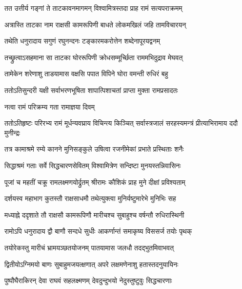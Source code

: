 \twolineshloka
{तत उत्तीर्य गङ्गां ते ताटकावनमागमन्}
{विश्वामित्रस्तदा प्राह रामं सत्यपराक्रमम्} %

\twolineshloka
{अत्रास्ति ताटका नाम राक्षसी कामरूपिणी}
{बाधते लोकमखिलं जहि तामविचारयन्} %

\twolineshloka
{तथेति धनुरादाय सगुणं रघुनन्दनः}
{टङ्कारमकरोत्तेन शब्देनापूरयद्वनम्} %

\twolineshloka
{तच्छ्रुत्वाऽसहमाना सा ताटका घोररूपिणी}
{क्रोधसम्मूर्च्छिता राममभिदुद्राव मेघवत्} %

\twolineshloka
{तामेकेन शरेणाशु ताडयामास वक्षसि}
{पपात विपिने घोरा वमन्ती रुधिरं बहु} %

\twolineshloka
{ततोऽतिसुन्दरी यक्षी सर्वाभरणभूषिता}
{शापात्पिशाचतां प्राप्ता मुक्ता रामप्रसादतः} %

\onelineshloka
{नत्वा रामं परिक्रम्य गता रामाज्ञया दिवम्} %

\fourlineindentedshloka
{ततोऽतिहृष्टः परिरभ्य रामं}
{मूर्धन्यवघ्राय विचिन्त्य किञ्चित्}
{सर्वास्त्रजालं सरहस्यमन्त्रं}
{प्रीत्याभिरामाय ददौ मुनीन्द्रः} %




\twolineshloka
{तत्र कामाश्रमे रम्ये कानने मुनिसङ्कुले}
{उषित्वा रजनीमेकां प्रभाते प्रस्थिताः शनैः} %

\twolineshloka
{सिद्धाश्रमं गताः सर्वे सिद्धचारणसेवितम्}
{विश्वामित्रेण सन्दिष्टा मुनयस्तन्निवासिनः} %

\twolineshloka
{पूजां च महतीं चक्रू रामलक्ष्मणयोर्द्रुतम्}
{श्रीरामः कौशिकं प्राह मुने दीक्षां प्रविश्यताम्} %

\twolineshloka
{दर्शयस्व महाभाग कुतस्तौ राक्षसाधमौ}
{तथेत्युक्त्वा मुनिर्यष्टुमारेभे मुनिभिः सह} %

\twolineshloka
{मध्याह्ने ददृशाते तौ राक्षसौ कामरूपिणौ}
{मारीचश्च सुबाहुश्च वर्षन्तौ रुधिरास्थिनी} %

\twolineshloka
{रामोऽपि धनुरादाय द्वौ बाणौ सन्दधे सुधीः}
{आकर्णान्तं समाकृष्य विससर्ज तयोः पृथक्} %

\twolineshloka
{तयोरेकस्तु मारीचं भ्रामयञ्छतयोजनम्}
{पातयामास जलधौ तदद्भुतमिवाभवत्} %

\twolineshloka
{द्वितीयोऽग्निमयो बाणः सुबाहुमजयत्क्षणात्}
{अपरे लक्षमणेनाशु हतास्तदनुयायिनः} %

\twolineshloka
{पुष्पौघैराकिरन् देवा राघवं सहलक्ष्मणम्}
{देवदुन्दुभयो नेदुस्तुष्टुवुः सिद्धचारणाः} %

